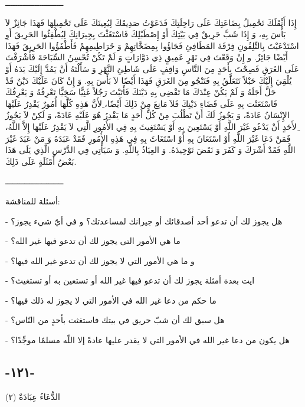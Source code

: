 \documentclass[a5paper]{article}
\begin{document}
ــــــــــــــــــــــــ

إِذَا أَثْقَلَكَ تَحْمِيلُ بِضَاعَتِكَ عَلَى رَاحِلَتِكَ فَدَعَوْتُ صَدِيقَكَ لِيُعِينَكَ عَلَى تَحْمِيلِهَا فَهَذَا جَائِزٌ لاَ بَأْسَ بِهِ، وَ إِذَا شَبَّ حَرِيقٌ فِي بَيْتِكَ أَوْ إِصْطَبْلِكَ فَاسْتَغَثْتَ بِجِيرَانِكَ لِيُطْفِئُوا الحَرِيقَ أَوِ اسْتَدْعَيْتَ بِالتِّلِفُونِ فِرْقَةَ المَطَافِئِ فَجَاؤُوا بِمِضَخَّاتِهِمْ وَ خَرَاطِيمِهِمْ فَأَطْفَؤُوا الحَرِيقَ فَهَذَا أَيْضًا جَائِزٌ. و إِنْ وَقَعْتَ فِي نَهْرٍ عَمِيقٍ ذِي دَوَّارَاتٍ وَ لَمْ تَكُنْ تُحْسِنُ السِّبَاحَةَ فَأَشْرَفْتَ عَلَى الغَرَقِ فَصِحْتَ بِأَحَدٍ مِنَ النَّاسِ وَاقِفٍ عَلَى شَاطِئِ النَّهْرِ وَ سَأَلْتَهُ أَنْ يَمُدَّ إِلَيْكَ يَدَهُ أَوْ يُلْقِيَ إِلَيْكَ حَبْلاً تَتَعَلَّقُ بِهِ فَتَنْجُو مِنَ الغَرَقِ فَهَذَا أَيْضًا لاَ بَأْسَ بِهِ. وَ إِنْ كَانَ عَلَيْكَ دَيْنٌ قَدْ حَلَّ أَجَلَهُ وَ لَمْ يَكُنْ عِنْدَكَ مَا تَقْضِي بِهِ دَيْنَكَ فَأَتَيْتَ رَجُلاً غَنِيًّا سَخِيًّا تَعْرِفُهُ وَ يَعْرِفُكَ فَاسْتَعَنْت بِهِ عَلَى قَضَاءِ دَيْنِكَ فَلاَ مَانِعَ مِنْ ذَلِكَ أَيْضًا، ِلأَنَّ هَذِهِ كُلَّهَا أُمُورٌ يَقْدِرُ عَلَيْهَا الإِنْسَانُ عَادَةً، وَ يَجُوزُ لَكَ أَنْ تَطْلُبَ مِنْ كُلِّ أَحَدٍ مَا يَقْدِرُ هُوَ عَلَيْهِ عَادَةً، وَ لَكِنْ لاَ يَجُوزُ ِلأَحَدٍ أَنْ يَدْعُو غَيْرَ اللَّهِ أَوْ يَسْتَعِينَ بِهِ أَوْ يَسْتَغِيثَ بِهِ فِي الأُمُورِ الَّتِي لاَ يَقْدِرُ عَلَيْهَا إِلاَّ اللَّهُ، فَمَنْ دَعَا غَيْرَ اللَّهِ أَوْ اسْتَعَانَ بِهِ أَوْ اسْتَغَاثَ بِهِ فِي هَذِهِ الأُمُورِ فَقَدْ عَبَدَهُ وَ مَنْ عَبَدَ غَيْرَ اللَّهِ فَقَدْ أَشْرَكَ وَ كَفَرَ وَ نَقَضَ تَوْحِيدَهُ. وَ العِيَاذُ بِاللَّهِ. وَ سَيَأْتِي فِي الدَّرْسِ الَّذِي يَلَى هَذَا بَعْضُ أَمْثَلَةٍ عَلَى ذَلِكَ.

ــــــــــــــــــــــــ

أسئلة للمناقشة:

- هل يجوز لك أن تدعو أحد أصدقائك أو جيرانك لمساعدتك؟ و في أيّ شيء يجوز؟

- ما هي الأمور التى يجوز لك أن تدعو فيها غير الله؟

- و ما هي الأمور التي لا يجوز لك أن تدعو غير الله فيها؟ 

- ايت بعدة أمثلة يجوز لك أن تدعو فيها غير الله أو تستعين به أو تستغيث؟

- ما حكم من دعا غير الله في الأمور التي لا يجوز له ذلك فيها؟

- هل سبق لك أن شبّ حريق في بيتك فاستغثت بأحدٍ من النّاس؟

- هل يكون من دعا غير الله في الأمور التي لا يقدر عليها عادةً إلا اللّه مسلمًا موجِّدًا؟

\subsection{-١٢١-}
الدُّعَاءُ عِبَادَةٌ (٢)
\end{document}
